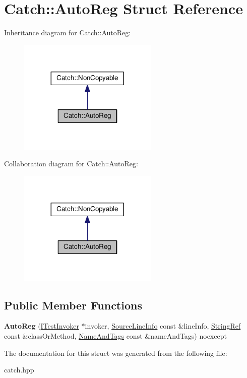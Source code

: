 \hypertarget{structCatch_1_1AutoReg}{}\section{Catch\+:\+:Auto\+Reg Struct Reference}
\label{structCatch_1_1AutoReg}


Inheritance diagram for Catch\+:\+:Auto\+Reg\+:\nopagebreak
\begin{figure}[H]
\begin{center}
\leavevmode
\includegraphics[width=188pt]{structCatch_1_1AutoReg__inherit__graph}
\end{center}
\end{figure}


Collaboration diagram for Catch\+:\+:Auto\+Reg\+:\nopagebreak
\begin{figure}[H]
\begin{center}
\leavevmode
\includegraphics[width=188pt]{structCatch_1_1AutoReg__coll__graph}
\end{center}
\end{figure}
\subsection*{Public Member Functions}
\begin{DoxyCompactItemize}
\item 
{\bfseries Auto\+Reg} (\hyperlink{structCatch_1_1ITestInvoker}{I\+Test\+Invoker} $\ast$invoker, \hyperlink{structCatch_1_1SourceLineInfo}{Source\+Line\+Info} const \&line\+Info, \hyperlink{classCatch_1_1StringRef}{String\+Ref} const \&class\+Or\+Method, \hyperlink{structCatch_1_1NameAndTags}{Name\+And\+Tags} const \&name\+And\+Tags) noexcept\hypertarget{structCatch_1_1AutoReg_a7eba02fb9d80b9896bf5a6517369af28}{}\label{structCatch_1_1AutoReg_a7eba02fb9d80b9896bf5a6517369af28}

\end{DoxyCompactItemize}


The documentation for this struct was generated from the following file\+:\begin{DoxyCompactItemize}
\item 
catch.\+hpp\end{DoxyCompactItemize}
